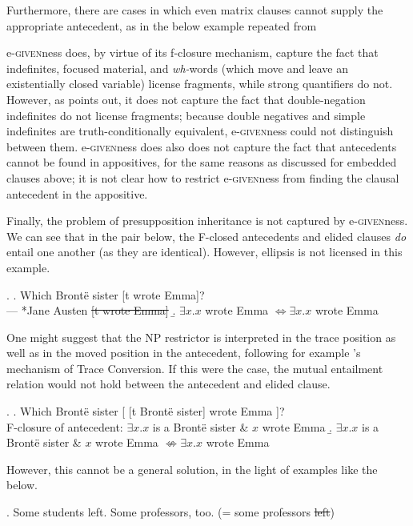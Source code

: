 \documentclass[doublespace]{umthesis}
\newcommand{\el}[1]{\sout{#1}}
\begin{document}
Furthermore, there are cases in which even matrix clauses cannot supply the appropriate antecedent, as in the below example repeated from  
	
e-\textsc{given}ness does, by virtue of its f-closure mechanism, capture the fact that indefinites, focused material, and {\it wh-}words (which move and leave an existentially closed variable) license fragments, while strong quantifiers do not.  However, as \cite{AB10} points out, it does not capture the fact that double-negation indefinites do not license fragments; because double negatives and simple indefinites are truth-conditionally equivalent, e-\textsc{given}ness could not distinguish between them. e-\textsc{given}ness does also does not capture the fact that antecedents cannot be found in appositives, for the same reasons as discussed for embedded clauses above; it is not clear how to restrict e-\textsc{given}ness from finding the clausal antecedent in the appositive.

Finally, the problem of presupposition inheritance is not captured by e-\textsc{given}ness. We can see that in the pair below, the F-closed antecedents and elided clauses \emph{do} entail one another (as they are identical). However, ellipsis is not licensed in this example.
   
   \ex. \a. Which Bront\"e sister [t wrote Emma]?\\
   		--- *Jane Austen \el{[t wrote Emma]}
   	\b. $\exists x. x$ wrote Emma $\Leftrightarrow \exists x. x$ wrote Emma
   
One might suggest that the NP restrictor is interpreted in the trace position as well as in the moved position in the antecedent, following for example \cite{Fo02}'s mechanism of Trace Conversion. If this were the case, the mutual entailment relation would not hold between the antecedent and elided clause.

\ex. 	\a. Which Bront\"e sister [ [t Bront\"e sister] wrote Emma ]?\\
		F-closure of antecedent: $\exists x. x$ is a Bront\"e sister \& $x$ wrote Emma
	\b. $\exists x. x$ is a Bront\"e sister \& $x$ wrote Emma $\not \Leftrightarrow \exists x. x$ wrote Emma

However, this cannot be a general solution, in the light of examples like the below.
   
   \ex. Some students left. Some professors, too. (= some professors \sout{left})
   
\end{document}
